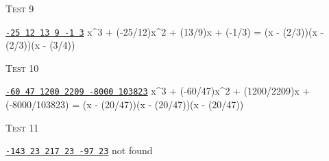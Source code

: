 \textsc{Test 9}
\begin{console}[commandchars=\\\{\}]
\underline{\texttt{-25 12 13 9 -1 3}}
x^3 + (-25/12)x^2 + (13/9)x + (-1/3) = (x - (2/3))(x - (2/3))(x - (3/4))
\end{console}


\textsc{Test 10}
\begin{console}[fontsize=\scriptsize,commandchars=\\\{\}]
\underline{\texttt{-60 47 1200 2209 -8000 103823}}
x^3 + (-60/47)x^2 + (1200/2209)x + (-8000/103823) = (x - (20/47))(x - (20/47))(x - (20/47))
\end{console}

\textsc{Test 11}
\begin{console}[commandchars=\\\{\}]
\underline{\texttt{-143 23 217 23 -97 23}}
not found
\end{console}

